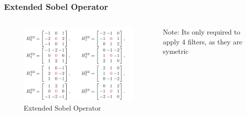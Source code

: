 \begin{frame}
\frametitle{Extended Sobel Operator}
\begin{columns}
\begin{column}{0.6\textwidth}
	\begin{figure}
		\centering
		\includegraphics[width=0.8\linewidth]{images/ExtendedSobel}
		\caption[Extended Sobel Operator]{Extended Sobel Operator}
		\label{fig:ESobel}
	\end{figure}
\end{column}
\begin{column}{0.4\textwidth}
	Note: Its only required to apply 4 filters, as they are symetric
\end{column}
\end{columns}
\end{frame}

